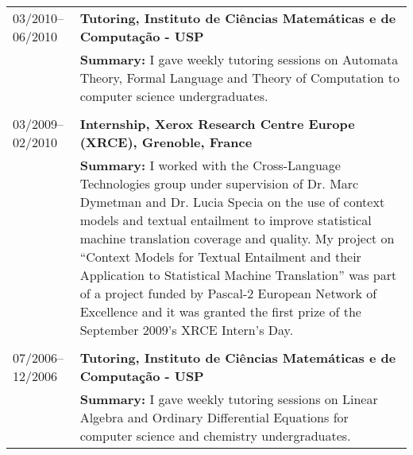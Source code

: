 \begin{tabular}{p{2.92cm}  p{13cm}}
03/2010--06/2010	& \bf Tutoring, Instituto de Ci\^encias Matem\'aticas e de Computa\c{c}\~ao - USP \\
	& {\bf Summary:} I gave weekly tutoring sessions on Automata Theory, Formal Language and Theory of Computation to computer science undergraduates. \\
	& \\
03/2009--02/2010	& \bf Internship, Xerox Research Centre Europe (XRCE), Grenoble, France \\
	& {\bf Summary:} I worked with the Cross-Language Technologies group under supervision of Dr. Marc Dymetman and Dr. Lucia Specia on the use of context models and textual entailment to improve statistical machine translation coverage and quality. My project on ``Context Models for Textual Entailment and their Application to Statistical Machine Translation'' was part of a project funded by Pascal-2 European Network of Excellence  and it was granted the first prize of the September 2009's XRCE Intern's Day. \\
	& \\
07/2006--12/2006	& \bf Tutoring, Instituto de Ci\^encias Matem\'aticas e de Computa\c{c}\~ao - USP \\
	& {\bf Summary:} I gave weekly tutoring sessions on Linear Algebra and Ordinary Differential Equations for computer science and chemistry undergraduates. \\
\end{tabular}

